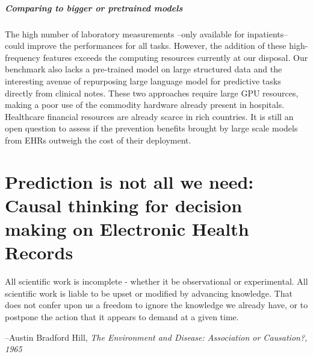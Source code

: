 \documentclass[french,12pt,twoside,a4paper]{book}
\newenvironment{citationbox}{
  \begin{tcolorbox}[
      enhanced,
      colback=gray!10, %
      colframe=white, %
      arc=0mm, %
      boxrule=0.5pt, %
      rightrule=0pt, %
      left=0pt, %
      right=0pt, %
      top=0pt, %
      bottom=0pt, %
      rightupper=0mm, %
      rightlower=0mm, %
      width=0.9\textwidth,
      flush right,
    ]
    \footnotesize %
    \itshape %
    }{
  \end{tcolorbox}%
}
\begin{document}
\paragraph{Comparing to bigger or pretrained models}
The high number of laboratory measurements --only available for inpatients--
could improve the performances for all tasks. However, the addition of these
high-frequency features exceeds the computing resources currently at our
disposal. Our benchmark also lacks a pre-trained model on large structured data
and the interesting avenue of repurposing large language model for predictive
tasks directly from clinical notes. These two approaches require large GPU
resources, making a poor use of the commodity hardware already present in
hospitals. Healthcare financial resources are already scarce in rich countries.
It is still an open question to assess if the prevention benefits brought by
large scale models from EHRs outweigh the cost of their deployment.


\chapter{Prediction is not all we need: Causal thinking for decision making on
  Electronic Health Records}\label{chapter:causal_tuto}

\begin{citationbox}
  All scientific work is incomplete - whether it be observational or
  experimental. All scientific work is liable to be upset or modified by
  advancing knowledge. That does not confer upon us a freedom to ignore the
  knowledge we already have, or to postpone the action that it appears to demand
  at a given time.%

  \par\hfill --Austin Bradford Hill, \textit{The Environment and Disease: Association or Causation?, 1965}
\end{citationbox}
\end{document}
